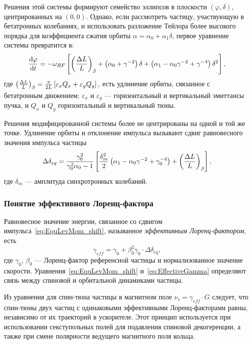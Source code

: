 \documentclass{report}
\begin{document}
Решения этой системы формируют семейство эллипсов в плоскости
$(\varphi, \delta)$, центрированных на $(0,0)$. Однако, если
рассмотреть частицу, участвующую в бетатронных колебаниях, и
использовать разложение Тейлора более высокого порядка для
коэффициента сжатия орбиты $\alpha = \alpha_0 + \alpha_1\delta$,
первое уравнение системы превратится в:~\citep[p.~2579]{Senichev:IPAC13}
\[
\ddt{\varphi} = -\w_{RF} \bkt*{\bkt{\frac{\Delta L}{L}}_\beta + \bkt{\alpha_0 + \gamma^{-2}}\delta + \bkt{\alpha_1 - \alpha_0\gamma^{-2} + \gamma^{-4}}\delta^2},
\]
где $\bkt{\frac{\Delta L}{L}}_\beta =
\frac{\pi}{2L}\bkt*{\varepsilon_xQ_x + \varepsilon_yQ_y},$ есть
удлинение орбиты, связанное с бетатронным движением; $\varepsilon_x$ и
$\varepsilon_y$ --- горизонтальный и вертикальный эмиттансы пучка, и
$Q_x$ и $Q_y$ горизонтальный и вертикальный тюны.~\citep[p.~2580]{Senichev:IPAC13}

Решения модифицированной системы более не центрированы на одной и той
же точке. Удлинение орбиты и отклонение импульса вызывают сдвиг
равновесного значения импульса частицы~\citep[p.~2581]{Senichev:IPAC13}
\begin{equation}\label{eq:EquLevMom_shift}
  \Delta\delta_{eq} = \frac{\gamma_0^2}{\gamma_0^2\alpha_0 - 1}\bkt*{\frac{\delta_m^2}{2}\bkt{\alpha_1 - \alpha_0\gamma^{-2} + \gamma_0^{-4}} + \bkt{\frac{\Delta L}{L}}_\beta},
\end{equation}
где $\delta_m$ --- амплитуда синхротронных колебаний.

\subsubsection{Понятие эффективного Лоренц-фактора}
Равновесное значение энергии, связанное со сдвигом импульса~\eqref{eq:EquLevMom_shift}, называнное \emph{эффективным Лоренц-фактором}, есть~\cite{Senichev:FDM}
\begin{equation}\label{eq:EffectiveGamma}
  \gamma_{eff} = \gamma_0 + \beta_0^2\gamma_0\cdot\Delta\delta_{eq},
\end{equation}
где $\gamma_0$, $\beta_0$ --- Лоренц-фактор референсной частицы и
нормализованное значение
скорости. Уравнения~\eqref{eq:EquLevMom_shift}
и~\eqref{eq:EffectiveGamma} определяют связь между спиновой и
орбитальной динамиками частицы.

Из уравнения для спин-тюна частицы в магнитном поле $\nu_s = \gamma_{eff}\cdot G$ следует, что спин-тюны двух частиц с одинаковыми эффективными Лоренц-факторами равны, независимо от их траекторий в ускорителе. Этот принцип используется при использовании секступольных полей для подавления спиновой декогеренции, а также при смене полярности ведущего магнитного поля кольца.
\end{document}
